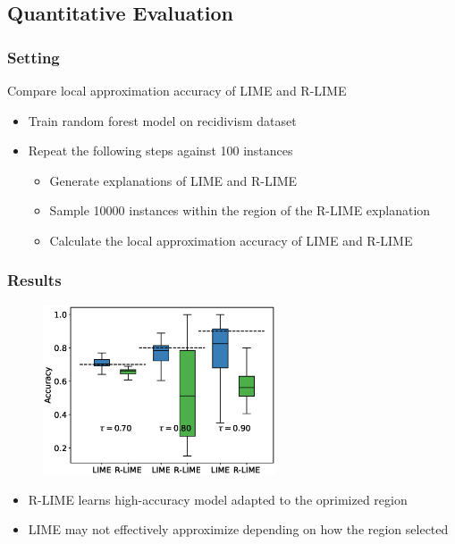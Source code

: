 \documentclass[aspectratio=169]{slide-ja}
\begin{document}
\subsection{Quantitative Evaluation}

\subsubsection{Setting}

\begin{frame}{}
  Compare local approximation accuracy of LIME and R-LIME
  \begin{itemize}
    \item Train random forest model on recidivism dataset
    \item Repeat the following steps against 100 instances
          \begin{itemize}
            \item Generate explanations of LIME and R-LIME
            \item Sample 10000 instances within the region of
                  the R-LIME explanation
            \item Calculate the local approximation accuracy of LIME and R-LIME
          \end{itemize}
  \end{itemize}
\end{frame}

\subsubsection{Results}
\begin{frame}{}
  \begin{figure}
    \includegraphics[height=142pt]{box_plot}
  \end{figure}
  \begin{itemize}
    \item R-LIME learns high-accuracy model adapted to the oprimized region
    \item LIME may not effectively approximize depending on how the region selected
  \end{itemize}
\end{frame}
\end{document}
